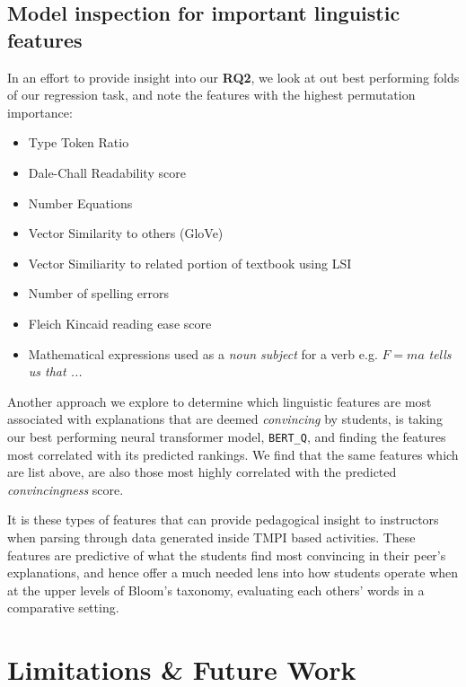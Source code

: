 \documentclass[notitlepage,12pt]{jedm}
\begin{document}
\subsection{Model inspection for important linguistic features}
In an effort to provide insight into our \textbf{RQ2}, we look at out best 
performing folds of our regression task, and note the features with the highest 
permutation importance:

\begin{itemize}
	\item Type Token Ratio
	\item Dale-Chall Readability score
	\item Number Equations
	\item Vector Similarity to others (GloVe)
	\item Vector Similiarity to related portion of textbook using LSI
	\item Number of spelling errors
	\item Fleich Kincaid reading ease score
	\item Mathematical expressions used as a \textit{noun subject} for a verb  
	e.g. $F=ma$ \textit{tells us that ...}
\end{itemize}

Another approach we explore to determine which linguistic features are most 
associated with explanations that are deemed \textit{convincing} by students, 
is taking our best performing neural transformer model, \verb|BERT_Q|, and 
finding the features most correlated with its predicted rankings. 
We find that the same features which are list above, are also those most highly 
correlated with the predicted \textit{convincingness} score.


It is these types of features that can provide pedagogical insight to 
instructors when parsing through data generated inside TMPI based activities.
These features are predictive of what the students find most convincing in 
their peer's explanations, and hence offer a much needed lens into how students 
operate when at the upper levels of Bloom's taxonomy, evaluating each others' 
words in a comparative setting.

\section{Limitations \& Future Work}
\end{document}
